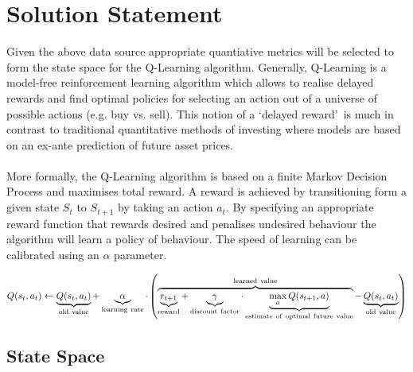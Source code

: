 \documentclass[dvips,12pt]{article}
\begin{document}
\section{Solution Statement}
Given the above data source appropriate quantiative metrics will be selected to form the state space for the Q-Learning algorithm\cite{sutton1998}. Generally, Q-Learning is a model-free reinforcement learning algorithm which allows to realise delayed rewards and find optimal policies for selecting an action out of a universe of possible actions (e.g. buy vs. sell). This notion of a \lq delayed reward\rq ~is much in contrast to traditional quantitative methods of investing where models are based on an ex-ante prediction of future asset prices.
\\\\
More formally, the Q-Learning algorithm is based on a finite Markov Decision Process and maximises total reward. A reward is achieved by transitioning form a given state $S_t$ to $S_{t+1}$ by taking an action $a_t$. By specifying an appropriate reward function that rewards desired and penalises undesired behaviour the algorithm will learn a policy of behaviour. The speed of learning can be calibrated using an $\alpha$ parameter.

\begin{equation}
	Q(s_{t},a_{t}) \leftarrow \underbrace{Q(s_{t},a_{t})}_{\rm old~value} + \underbrace{\alpha}_{\rm learning~rate} \cdot \left( \overbrace{\underbrace{r_{t+1}}_{\rm reward} + \underbrace{\gamma}_{\rm discount~factor} \cdot \underbrace{\max_{a}Q(s_{t+1}, a)}_{\rm estimate~of~optimal~future~value}}^{\rm learned~value} - \underbrace{Q(s_{t},a_{t})}_{\rm old~value} \right)
\end{equation}

\subsection*{State Space}
\end{document}
